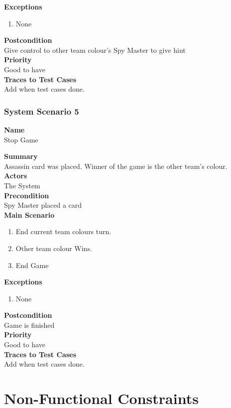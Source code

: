 \documentclass[12pt]{article}
\begin{document}
\noindent
{\bf Exceptions}
\begin{enumerate}
\item None
\end{enumerate}
\noindent
{\bf Postcondition}\\
Give control to other team colour's Spy Master to give hint\\
\noindent
{\bf Priority}\\
Good to have\\
\noindent
{\bf Traces to Test Cases}\\
Add when test cases done.
\newpage
\subsubsection{System Scenario 5} \label{ss:5}

\noindent
{\bf Name}\\
Stop Game

\noindent
{\bf Summary}\\
Assassin card was placed. Winner of the game is the other team's colour.\\
\noindent
{\bf Actors}\\
The System\\
\noindent
{\bf Precondition}\\
Spy Master placed a card\\
\noindent
{\bf Main Scenario}\\
\vspace*{-0.2in}
\begin{enumerate}
\item End current team colours turn.
\item Other team colour Wins.
\item End Game
\end{enumerate}

\noindent
{\bf Exceptions}
\begin{enumerate}
\item None
\end{enumerate}
\noindent
{\bf Postcondition}\\
Game is finished\\
\noindent
{\bf Priority}\\
Good to have\\
\noindent
{\bf Traces to Test Cases}\\
Add when test cases done.
\newpage
\section{Non-Functional Constraints}
\end{document}
